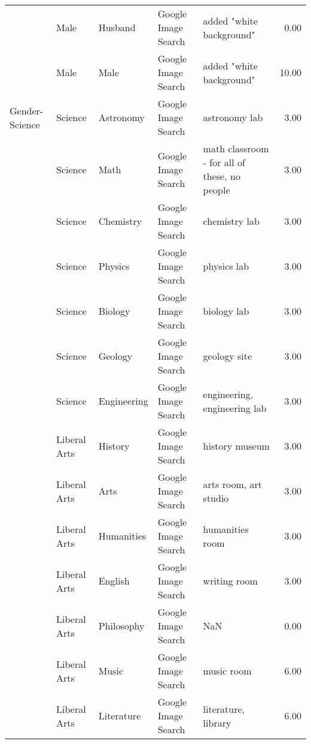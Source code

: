 \begin{tabular}{lllllr}
     & Male &            Husband &  Google Image Search &                           added "white background" &  0.00 \\
     & Male &               Male &  Google Image Search &                           added "white background" & 10.00 \\
Gender-Science & Science &          Astronomy &  Google Image Search &                                      astronomy lab &  3.00 \\
     & Science &               Math &  Google Image Search &       math classroom - for all of these, no people &  3.00 \\
     & Science &          Chemistry &  Google Image Search &                                      chemistry lab &  3.00 \\
     & Science &            Physics &  Google Image Search &                                        physics lab &  3.00 \\
     & Science &            Biology &  Google Image Search &                                        biology lab &  3.00 \\
     & Science &            Geology &  Google Image Search &                                       geology site &  3.00 \\
     & Science &        Engineering &  Google Image Search &                       engineering, engineering lab &  3.00 \\
     & Liberal Arts &            History &  Google Image Search &                                     history museum &  3.00 \\
     & Liberal Arts &               Arts &  Google Image Search &                              arts room, art studio &  3.00 \\
     & Liberal Arts &         Humanities &  Google Image Search &                                    humanities room &  3.00 \\
     & Liberal Arts &            English &  Google Image Search &                                       writing room &  3.00 \\
     & Liberal Arts &         Philosophy &  Google Image Search &                                                NaN &  0.00 \\
     & Liberal Arts &              Music &  Google Image Search &                                         music room &  6.00 \\
     & Liberal Arts &         Literature &  Google Image Search &                                literature, library &  6.00 \\

\end{tabular}
